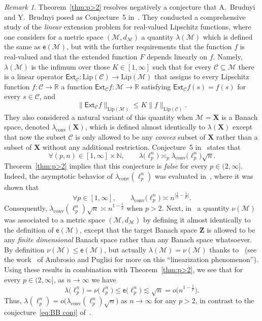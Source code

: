 \documentclass[11pt,reqno]{amsart}
\renewcommand{\le}{\leqslant}
\newcommand{\X}{\mathbf X}
\newcommand{\R}{\mathbb R}
\theoremstyle{remark}
\newtheorem{remark}[theorem]{Remark}
\newcommand{\MM}{\mathcal{M}}
\renewcommand{\subset}{\subseteq}
\newcommand{\N}{\mathbb N}
\newcommand{\Lip}{\mathrm{Lip}}
\newcommand{\ee}{\mathsf{e}}
\newcommand{\bfZ}{\mathbf{Z}}
\newcommand{\sub}{\mathscr{C}}
\renewcommand{\1}{\mathbf 1}
\newcommand{\conv}{\mathrm{conv}}
\begin{document}
 \begin{remark}\label{rem:BB conjecture}
 Theorem~\ref{thm:p>2} resolves negatively a conjecture  that A.~Brudnyi and Y.~Brudnyi posed as Conjecture~5 in~\cite{BB05}. They conducted a comprehensive study of the {\em linear} extension problem for  real-valued Lipschitz functions, where one considers for a metric space $(\MM,d_\MM)$ a quantity $\lambda(\MM)$ which is defined the same as  $\ee(\MM)$, but with the further requirements that the function $f$ is real-valued and that the extended function $F$ depends linearly on $f$. Namely,  $\lambda(\MM)$ is the infimum over those $K\in [1,\infty]$ such that for every $\sub\subset \MM$ there is a linear operator $\mathsf{Ext}_\sub:\Lip(\sub)\to \Lip(\MM)$ that assigns to every Lipschitz function $f:\sub\to \R$ a function $\mathsf{Ext}_\sub f:\MM\to \R$  satisfying $\mathsf{Ext}_\sub f(s)=f(s)$ for every $s\in \sub$, and  $$\|\mathsf{Ext}_\sub f\|_{\Lip(\MM)}\le K\|f\|_{\Lip(\sub)}.$$ They  also considered a natural variant of this quantity when $\MM=\X$ is a Banach space, denoted $\lambda_\conv(\X)$, which is defined almost identically to $\lambda(\X)$ except that now the subset $\sub$ is only allowed to be any {\em convex} subset of $\X$ rather than a  subset of $\X$ without any additional restriction. Conjecture~5 in~\cite{BB05} states that
 \begin{equation}\label{eq:BB conj}
 \forall (p,n)\in [1,\infty]\times \N,\qquad  \lambda\big(\ell_p^n\big)\asymp_p \lambda_{\conv}\big(\ell_p^n\big)\sqrt{n}.
 \end{equation}
Theorem~\ref{thm:p>2}  implies that this conjecture is {\em false} for every $p\in (2,\infty]$. Indeed, the asymptotic behavior of $\lambda_{\conv}(\ell_p^n)$ was evaluated in~\cite[Theorem~2.19]{BB07}, where it was shown that
 $$
 \forall  p\in [1,\infty],\qquad \lambda_{\conv}\big(\ell_p^n\big)\asymp n^{\big|\frac12-\frac{1}{p}\big|}.
 $$
Consequently, $\lambda_{\conv}(\ell_p^n)\sqrt{n}\asymp n^{1-\frac{1}{p}}$ when $p>2$. Next, in~\cite{BB07-2} a quantity $\nu(\MM)$ was associated  to a metric space $(\MM,d_\MM)$ by defining it almost identically to the definition of $\ee(\MM)$, except that the target Banach space $\bfZ$ is allowed to be any {\em finite dimensional} Banach space rather than any Banach space whatsoever. By definition $\nu(\MM)\le \ee(\MM)$, but actually   $\lambda(\MM)=\nu(\MM)$ thanks to~\cite[Theorem~1.2]{BB07-2} (see the work~\cite{AP20} of Ambrosio and Puglisi for more on this ``linearization phenomenon''). Using these results in combination with Theorem~\ref{thm:p>2}, we see that for every $p\in (2,\infty]$,   as $n\to \infty$ we have
 $$\lambda\big(\ell_p^n\big)=\nu\big(\ell_p^n\big)\le\ee\big(\ell_p^n\big)\lesssim \sqrt{n}=o\Big(n^{1-\frac{1}{p}}
 \Big).$$
Thus,   $\lambda(\ell_p^n)=o\big(\lambda_{\conv}(\ell_p^n)\sqrt{n}\big)$ as $n\to \infty$ for any $p>2$, in contrast to the conjecture~\eqref{eq:BB conj} of~\cite{BB05}.
\end{remark}
\end{document}
